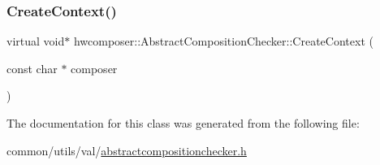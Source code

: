 \subsubsection{\texorpdfstring{Create\+Context()}{CreateContext()}}
{\footnotesize\ttfamily virtual void$\ast$ hwcomposer\+::\+Abstract\+Composition\+Checker\+::\+Create\+Context (\begin{DoxyParamCaption}\item[{const char $\ast$}]{composer }\end{DoxyParamCaption})\hspace{0.3cm}{\ttfamily [pure virtual]}}



The documentation for this class was generated from the following file\+:\begin{DoxyCompactItemize}
\item 
common/utils/val/\mbox{\hyperlink{abstractcompositionchecker_8h}{abstractcompositionchecker.\+h}}\end{DoxyCompactItemize}
